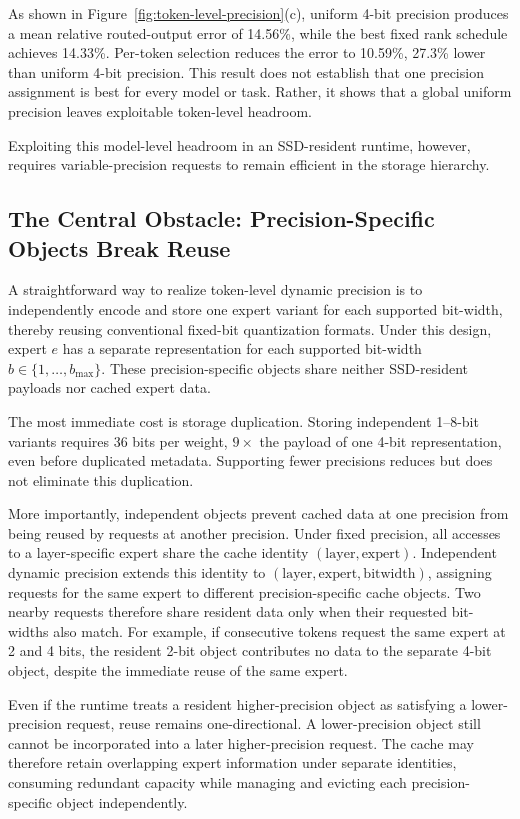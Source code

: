 \documentclass[sigconf, nonacm]{acmart}
\begin{document}
As shown in Figure~\ref{fig:token-level-precision}(c), uniform 4-bit
precision produces a mean relative routed-output error of 14.56\%,
while the best fixed rank schedule achieves 14.33\%. Per-token
selection reduces the error to 10.59\%, 27.3\% lower than uniform
4-bit precision. This result does not establish
that one precision assignment is best for every model or task.
Rather, it shows that a global uniform precision leaves exploitable
token-level headroom.

Exploiting this model-level headroom in an SSD-resident runtime,
however, requires variable-precision requests to remain efficient in
the storage hierarchy. 

\subsection{The Central Obstacle: Precision-Specific Objects Break Reuse}
\label{sec:challenge-cross-precision}

A straightforward way to realize token-level dynamic precision is to
independently encode and store one expert variant for each supported
bit-width, thereby reusing conventional fixed-bit quantization formats.
Under this design, expert \(e\) has a separate representation for each supported bit-width
\(b\in\{1,\ldots,b_{\max}\}\). These precision-specific objects share
neither SSD-resident payloads nor cached expert data.

The most immediate cost is storage duplication. Storing independent 1--8-bit variants requires 36 bits per weight, \(9\times\) the payload of one 4-bit representation, even before duplicated metadata. Supporting fewer precisions reduces but does not eliminate this duplication.

More importantly, independent objects prevent cached data at one
precision from being reused by requests at another precision. Under
fixed precision, all accesses to a layer-specific expert share the
cache identity
\((\mathrm{layer},\mathrm{expert})\). Independent dynamic precision
extends this identity to
\((\mathrm{layer},\mathrm{expert},\mathrm{bitwidth})\), assigning
requests for the same expert to different precision-specific cache
objects. Two nearby requests therefore share resident data only when
their requested bit-widths also match. For example, if consecutive
tokens request the same expert at 2 and 4 bits, the resident 2-bit
object contributes no data to the separate 4-bit object, despite the
immediate reuse of the same expert.

Even if the runtime treats a resident higher-precision object as
satisfying a lower-precision request, reuse remains one-directional.
A lower-precision object still cannot be incorporated into a later
higher-precision request. The cache may therefore retain overlapping
expert information under separate identities, consuming redundant
capacity while managing and evicting each precision-specific object
independently.
\end{document}
